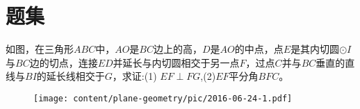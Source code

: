 
\section{题集}

\begin{exercise}
\label{exercise:2016-06-24-1}
  如图，在三角形$ABC$中，$AO$是$BC$边上的高，$D$是$AO$的中点，点$E$是其内切圆$\odot I$与$BC$边的切点，连接$ED$并延长与内切圆相交于另一点$F$，过点$C$并与$BC$垂直的直线与$BI$的延长线相交于$G$，求证:(1) $EF \perp FG$,(2)$EF$平分角$BFC$。
\end{exercise}
\begin{figure}[htbp]
  \centering
\texttt{[image: content/plane-geometry/pic/2016-06-24-1.pdf]}
\caption{}
\label{fig:2016-06-24-1}
\end{figure}
  
